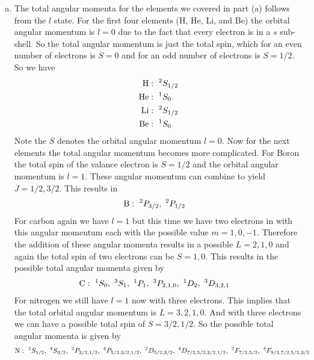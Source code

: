 \documentclass[11pt]{article}
\numberwithin{equation}{section}
\begin{document}
\begin{enumerate}[(a)]
\item
The total angular momenta for the elements we covered in part (a) follows from the $l$ state. For the first four elements (H, He, Li, and Be) the orbital angular momentum is $l=0$ due to the fact that every electron is in a $s$ sub-shell. So the total angular momentum is just the total spin, which for an even number of electrons is $S=0$ and for an odd number of electrons is $S=1/2$. So we have
\begin{align*}
\textnormal{H} &:\ ^2S_{1/2}\\
\textnormal{He} &:\ ^1S_{0}\\
\textnormal{Li} &:\ ^2S_{1/2}\\
\textnormal{Be} &:\ ^1S_{0}
\end{align*}
Note the $S$ denotes the orbital angular momentum $l=0$. Now for the next elements the total angular momentum becomes more complicated. For Boron the total spin of the valance electron is $S=1/2$ and the orbital angular momentum is $l=1$. These angular momentum can combine to yield $J = 1/2,3/2$. This results in
\begin{align*}
\textnormal{B} &:\ ^2P_{3/2},\ ^2P_{1/2}
\end{align*}
For carbon again we have $l=1$ but this time we have two electrons in with this angular momentum each with the possible value $m = 1,0,-1$. Therefore the addition of these angular momenta results in a possible $L=2,1,0$ and again the total spin of two electrons can be $S=1,0$. This results in the possible total angular momenta given by
\begin{align*}
\textnormal{C} &:\ ^1S_{0},\ ^3S_{1},\ ^1P_{1},\ ^3P_{2,1,0},\ ^1D_{2},\ ^3D_{3,2,1}
\end{align*}
For nitrogen we still have $l=1$ now with three electrons. This implies that the total orbital angular momentum is $L = 3,2,1,0$. And with three electrons we can have a possible total spin of $S = 3/2, 1/2$. So the possible total angular momenta is given by
\begin{align*}
\textnormal{N} &:\ ^2S_{1/2},\ ^4S_{3/2},\ ^2P_{3/2,1/2},\ ^4P_{5/2,3/2,1/2},\ ^2D_{5/2,3/2},\ ^4D_{7/2,5/2,3/2,1/2},\ ^2F_{7/2,5/2},\ ^4F_{9/2,7/2,5/2,3/2}
\end{align*}
\end{enumerate}
\end{document}

